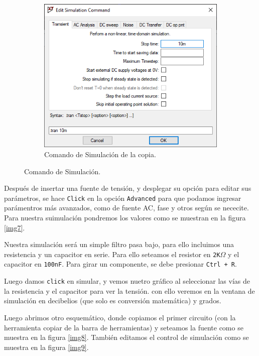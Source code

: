 \documentclass[a4paper]{article} %
\begin{document}
\begin{figure}
\begin{subfigure}[b]{0.45\textwidth}
		\includegraphics[scale=0.5]{IMAGENES/img9} %
		\caption{Comando de Simulación de la copia.} %
		\label{img9} %
	\end{subfigure}
	\caption{Comando de Simulación.}
	\label{fuentes6y9}
\end{figure}


Después de insertar una fuente de tensión, y desplegar su opción para editar sus parámetros, se hace \texttt{Click} en la opción \texttt{Advanced} para que podamos ingresar parámentros más avanzados, como de fuente AC, fase y otros según se nececite. Para nuestra suimulación pondremos los valores como se muestran en la figura \eqref{img7}.


Nuestra simulación será un simple filtro pasa bajo, para ello incluimos una resistencia y un capacitor en serie. Para ello seteamos el resistor en \texttt{2K$\Omega$} y el capacitor en \texttt{100nF}. Para girar un componente, se debe presionar \texttt{Ctrl + R}.

Luego damos \texttt{click} en simular, y vemos nuetro gráfico al seleccionar las vías de la resistencia y el capacitor para ver la tensión. con ello veremos en la ventana de simulación en decibelios (que solo es conversión matemática) y grados.

Luego abrimos otro esquemático, donde copiamos el primer circuito (con la herramienta copiar de la barra de herramientas) y seteamos la fuente como se muestra en la figura \eqref{img8}. También editamos el control de simulación como se muestra en la figura \eqref{img9}. 
\end{document}
